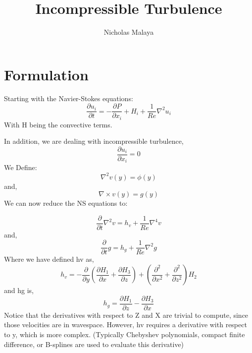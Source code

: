 \documentclass{article}
\title{\bf{Incompressible Turbulence}}
\author{Nicholas Malaya} \date{}
\begin{document}
\maketitle

%
%
\newpage
\section{Formulation}


Starting with the Navier-Stokes equations:
\begin{equation}
  \frac{\partial u_i}{\partial t} = -\frac{\partial P}{\partial x_i} + H_i + \frac{1}{Re}\nabla^2 u_i
\end{equation}
With H being the convective terms.

In addition, we are dealing with incompressible turbulence,
\begin{equation}
  \frac{\partial u_i}{\partial x_i} = 0
\end{equation}
We Define: 
\begin{equation}
  \nabla^2 v(y) = \phi(y)
\end{equation}
and, 
\begin{equation}
  \nabla \times v(y) = g(y)
\end{equation}
We can now reduce the NS equations to:

\begin{equation}
  \frac{\partial }{\partial t} \nabla^2 v = h_v + \frac{1}{Re}\nabla^4 v
\end{equation}
and,
\begin{equation}
  \frac{\partial}{\partial t} g = h_g + \frac{1}{Re}\nabla^2 g
\end{equation}
Where we have defined hv as, 
\begin{equation}
  h_v=-\frac{\partial}{\partial y}(\frac{\partial H_1}{\partial x} + \frac{\partial H_3}{\partial z}) + (\frac{\partial^2}{\partial x^2} + \frac{\partial^2}{\partial z^2})H_2
\end{equation}
and hg is,
\begin{equation}
  h_g= \frac{\partial H_1}{\partial z} - \frac{\partial H_3}{\partial x}
\end{equation}
Notice that the derivatives with respect to Z and X are trivial to compute, since those velocities are in wavespace. However, hv requires a derivative with respect to y, which is more complex. 
(Typically Chebyshev polynomials, compact finite difference, or B-splines are used to evaluate this derivative)
\end{document}

